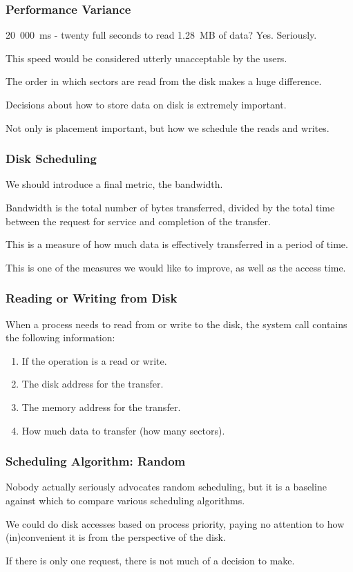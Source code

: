 \begin{frame}
\frametitle{Performance Variance}

20~000~ms - twenty full seconds to read 1.28~MB of data? Yes. Seriously. 

This speed would be considered utterly unacceptable by the users. 

The order in which sectors are read from the disk makes a huge difference. 

Decisions about how to store data on disk is extremely important. 

Not only is placement important, but how we schedule the reads and writes.


\end{frame}

\begin{frame}
\frametitle{Disk Scheduling}

We should introduce a final metric, the \alert{bandwidth}. 

Bandwidth is the total number of bytes transferred, divided by the total time between the request for service and completion of the transfer. 

This is a measure of how much data is effectively transferred in a period of time. 

This is one of the measures we would like to improve, as well as the access time.

\end{frame}

\begin{frame}
\frametitle{Reading or Writing from Disk}

When a process needs to read from or write to the disk, the system call contains the following information:

\begin{enumerate}
	\item If the operation is a read or write.
	\item The disk address for the transfer.
	\item The memory address for the transfer.
	\item How much data to transfer (how many sectors).
\end{enumerate}

\end{frame}

\begin{frame}
\frametitle{Scheduling Algorithm: Random}

Nobody actually seriously advocates random scheduling, but it is a baseline against which to compare various scheduling algorithms. 

We could do disk accesses based on process priority, paying no attention to how (in)convenient it is from the perspective of the disk.

If there is only one request, there is not much of a decision to make.

\end{frame}

